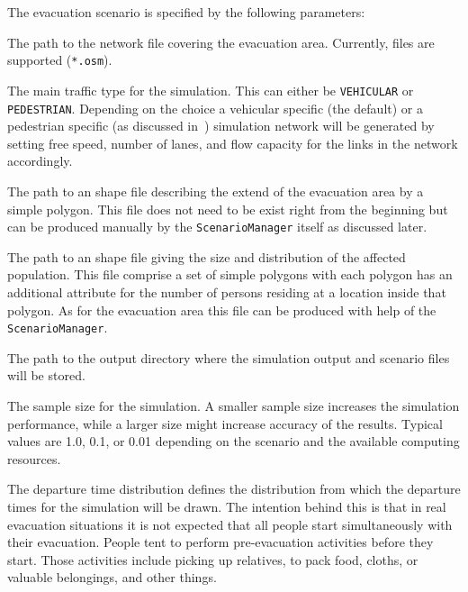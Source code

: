 The evacuation scenario is specified by the following parameters:
\begin{compactitem}
\item The path to the network file covering the evacuation area. Currently,   files are supported (\lstinline|*.osm|).
\item The main traffic type for the simulation. This can either be \lstinline|VEHICULAR| or \lstinline|PEDESTRIAN|. Depending on the choice a vehicular specific (the  default) or a pedestrian specific (as discussed in~\citet{LaemmelKluepfelNagel2009EvacPadangAtBookTimmermanns,Laemmel_PhDThesis_2011}) simulation network will be generated by setting free speed, number of lanes, and flow capacity for the links in the network accordingly.
\item The path to an  shape file describing the extend of the evacuation area by a simple polygon. This file does not need to be exist right from the beginning but can be produced manually by the \lstinline|ScenarioManager| itself as discussed later.
\item The path to an  shape file giving the size and distribution of the affected population. This file comprise a set of simple polygons with each polygon has an additional attribute for the number of persons residing at a location inside that polygon. As for the evacuation area this file can be produced with help of the \lstinline|ScenarioManager|.
\item The path to the output directory where the simulation output and  scenario files will be stored.
\item The sample size for the  simulation. A smaller sample size increases the simulation performance, while a larger size might increase accuracy of the results. Typical values are 1.0, 0.1, or 0.01 depending on the scenario and the available computing resources.
\item The departure time distribution defines the distribution from which the departure times for the simulation will be drawn. The intention behind this is that in real evacuation situations it is not expected that all people start simultaneously with their evacuation. 
People tent to perform pre-evacuation activities before they start. Those activities include picking up relatives, to pack food, cloths, or valuable belongings, and other things. 

\end{compactitem}
